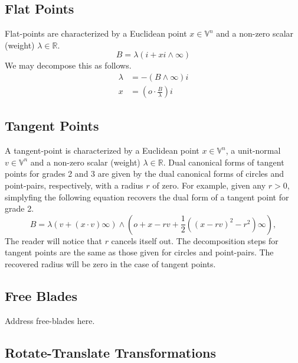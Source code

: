 \documentclass[12pt]{article}
\newcommand{\V}{\mathbb{V}}
\newcommand{\R}{\mathbb{R}}
\newcommand{\nvao}{o}
\newcommand{\nvai}{\infty}
\begin{document}
\subsection{Flat Points}

Flat-points are characterized by a Euclidean point $x\in\V^n$ and a non-zero
scalar (weight) $\lambda\in\R$.
\begin{equation*}
B = \lambda(i+xi\wedge\nvai)
\end{equation*}
We may decompose this as follows.
\begin{align*}
\lambda &= -(B\wedge\nvai)i \\
x &= \left(\nvao\cdot\frac{B}{\lambda}\right)i
\end{align*}

\subsection{Tangent Points}

A tangent-point is characterized by a Euclidean point $x\in\V^n$, a unit-normal $v\in\V^n$
and a non-zero scalar (weight) $\lambda\in\R$.  Dual canonical forms of tangent points for
grades 2 and 3 are given by the dual canonical forms of circles and point-pairs, respectively,
with a radius $r$ of zero.  For example, given any $r>0$, simplyfing the following equation recovers
the dual form of a tangent point for grade 2.
\begin{equation*}
B = \lambda(v+(x\cdot v)\nvai)\wedge\left(\nvao+x-rv+\frac{1}{2}((x-rv)^2-r^2)\nvai\right),
\end{equation*}
The reader will notice that $r$ cancels itself out.  The decomposition steps for tangent
points are the same as those given for circles and point-pairs.  The recovered radius
will be zero in the case of tangent points.

\subsection{Free Blades}

Address free-blades here.

\subsection{Rotate-Translate Transformations}
\end{document}
